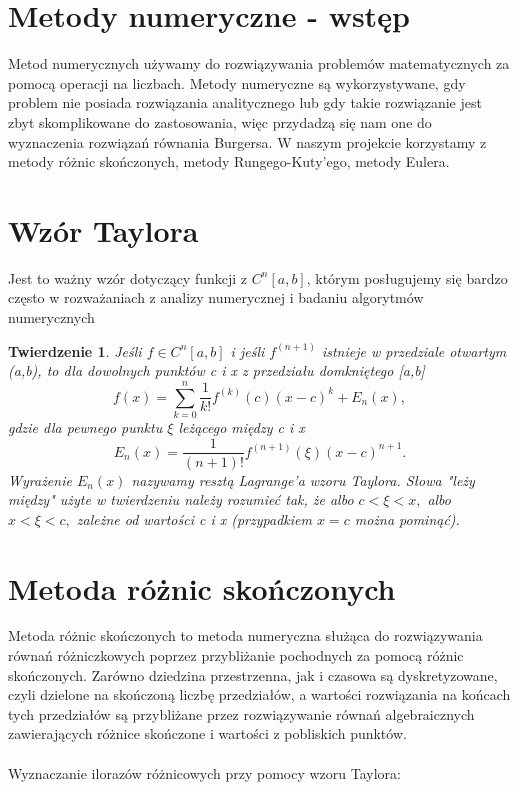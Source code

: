 \documentclass[a4paper,12pt]{article}
\newtheorem{theorem}{Twierdzenie}
\begin{document}
\section{Metody numeryczne - wstęp}
Metod numerycznych używamy do rozwiązywania problemów matematycznych za pomocą operacji na liczbach. Metody numeryczne są wykorzystywane, gdy problem nie posiada rozwiązania analitycznego lub gdy takie rozwiązanie jest zbyt skomplikowane do zastosowania, więc przydadzą się nam one do wyznaczenia rozwiązań równania Burgersa. W naszym projekcie korzystamy z metody różnic skończonych, metody Rungego-Kuty'ego, metody Eulera.
\\
\section{Wzór Taylora}
Jest to ważny wzór dotyczący funkcji z $C^n[a,b]$, którym posługujemy się bardzo często w rozważaniach z analizy numerycznej i badaniu algorytmów numerycznych
\begin{theorem}
Jeśli $f \in C^n [a,b]$ i jeśli $f^{(n+1)}$ istnieje w przedziale otwartym (a,b), to dla dowolnych punktów c i x z przedziału domkniętego [a,b]
$$f(x)=\sum_{k=0}^n \frac{1}{k!}f^{(k)}(c)(x-c)^k + E_n (x),$$
gdzie dla pewnego punktu $\xi$ leżącego między c i x
$$E_n (x) = \frac{1}{(n+1)!}f^{(n+1)}(\xi)(x-c)^{n+1}.$$
Wyrażenie $E_n(x)$ nazywamy resztą Lagrange'a wzoru Taylora. Słowa "leży między" użyte w twierdzeniu należy rozumieć tak, że albo $c<\xi<x,$ albo $x<\xi<c,$ zależne od wartości c i x (przypadkiem $x=c$ można pominąć). 
\end{theorem}
\section{Metoda różnic skończonych }
Metoda różnic skończonych to metoda numeryczna służąca do rozwiązywania równań różniczkowych poprzez przybliżanie pochodnych za pomocą różnic skończonych. Zarówno dziedzina przestrzenna, jak i czasowa są dyskretyzowane, czyli dzielone na skończoną liczbę przedziałów, a wartości rozwiązania na końcach tych przedziałów są przybliżane przez rozwiązywanie równań algebraicznych zawierających różnice skończone i wartości z pobliskich punktów.
\\ \\
Wyznaczanie ilorazów różnicowych przy pomocy wzoru Taylora: \\ \\
\end{document}
